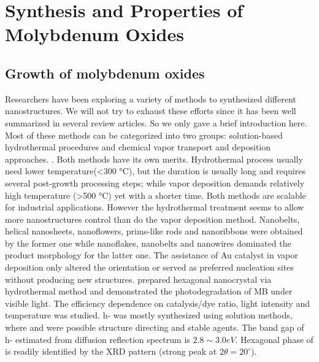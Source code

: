 \section{Synthesis and Properties of Molybdenum Oxides}

\subsection{Growth of molybdenum oxides}

Researchers have been exploring a variety of methods to synthesized different  nanostructures. We will not try to exhaust these efforts since it has been well summarized in several review articles.\cite{He2003} So we only gave a brief introduction here. Most of these methods can be categorized into two groups: solution-based hydrothermal procedures \citep{Li2002b,Xia2006,Li2006a,Camacho-Bragado2006} and chemical vapor transport and deposition approaches. \citep{Zeng1998,Li2002c,Li2002d,Zhou2003b,Fibers2007,Yan2009}. Both methods have its own merits. Hydrothermal process usually need lower temperature(\textless 300 \si{\degreeCelsius}), but the duration is usually long and requires several post-growth processing steps; while vapor deposition demands relatively high temperature (\textgreater 500 \si{\degreeCelsius}) yet with a shorter time. Both methods are scalable for industrial applications. However the hydrothermal treatment seems to allow more  nanostructures control than do the vapor deposition method. Nanobelts,\cite{Li2002b} helical nanosheets, nanoflowers, prims-like rods\cite{Li2006a} and nanoribbons\cite{Camacho-Bragado2006} were obtained by the former one while nanoflakes,\cite{Chen2009} nanobelts\cite{Hu2009} and nanowires\citep{Zhou2003b,Chen2011b} dominated the product morphology for the latter one. The assistance of Au catalyst in vapor deposition only altered the orientation\cite{Yan2009} or served as preferred nucleation sites\cite{Cai2011} without producing new  structures. \citeauthor{Chithambararaj2013} prepared hexagonal  nanocrystal via hydrothermal method and demonstrated the photodegradation of MB under visible light.\cite{Chithambararaj2013} The efficiency dependence on catalysis/dye ratio, light intensity and temperature was studied. h- was mostly synthesized using solution methods, where  and  were possible structure directing and stable agents. The band gap of h- estimated from diffusion reflection spectrum is $2.8\sim3.0eV$. Hexagonal phase of  is readily identified by the XRD pattern (strong peak at $2\theta=20^{\circ}$).

